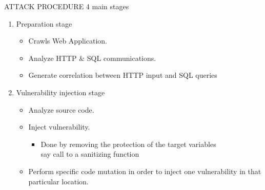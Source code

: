 \documentclass[xcolor=x11names,compress]{beamer}
\renewcommand{\(}{\begin{columns}}
\renewcommand{\)}{\end{columns}}
\newcommand{\<}[1]{\begin{column}{#1}}
\renewcommand{\>}{\end{column}}
\begin{document}
\begin{frame}{ATTACK PROCEDURE}
	4 main stages \newline
\begin{enumerate}
	\item Preparation stage
	\begin{itemize}
		\item Crawls Web Application.
		\item Analyze HTTP \& SQL communications.
		\item Generate correlation between HTTP input and SQL queries
	\end{itemize}
	\item  Vulnerability injection stage
	\begin{itemize}
		\item Analyze source code.
		\item Inject vulnerability.
		\begin{itemize}
			\item Done by removing
			the protection of the target variables \\say call to a sanitizing function
		\end{itemize}
		\item Perform specific code mutation in order to inject one vulnerability in that particular location.
	\end{itemize}
	
\end{enumerate}
\end{frame}
\end{document}
